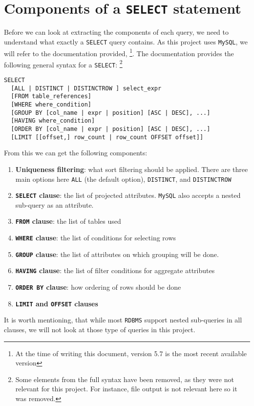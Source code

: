 \section{Components of a \texttt{SELECT} statement}
Before we can look at extracting the components of each query, we need to understand
what exactly a \texttt{SELECT} query contains. As this project uses \texttt{MySQL},
we will refer to the documentation provided, \cite{mysql:documentation}
\footnote{At the time
of writing this document, version 5.7 is the most recent available version}.
The documentation provides the following general syntax for a \texttt{SELECT}:
\footnote{Some elements from the full syntax have been removed, as they
were not relevant for this project. For instance, file output is not relevant here so it
was removed.}

\begin{verbatim}
SELECT
  [ALL | DISTINCT | DISTINCTROW ] select_expr
  [FROM table_references]
  [WHERE where_condition]
  [GROUP BY [col_name | expr | position] [ASC | DESC], ...]
  [HAVING where_condition]
  [ORDER BY [col_name | expr | position] [ASC | DESC], ...]
  [LIMIT [[offset,] row_count | row_count OFFSET offset]]
\end{verbatim}

From this we can get the following components:

\begin{enumerate}
  \item \textbf{Uniqueness filtering}: what sort filtering should be applied. There are
  three main options here \texttt{ALL} (the default option),
  \texttt{DISTINCT}, and \texttt{DISTINCTROW}
  \item \textbf{\texttt{SELECT} clause}: the list of projected attributes. \texttt{MySQL}
  also accepts a nested sub-query as an attribute.
  \item \textbf{\texttt{FROM} clause}: the list of tables used
  \item \textbf{\texttt{WHERE} clause}: the list of conditions for selecting rows
  \item \textbf{\texttt{GROUP} clause}: the list of attributes on which grouping will be
  done.
  \item \textbf{\texttt{HAVING} clause}: the list of filter conditions for aggregate
  attributes
  \item \textbf{\texttt{ORDER BY} clause}: how ordering of rows should be done
  \item \textbf{\texttt{LIMIT} and \texttt{OFFSET} clauses}
\end{enumerate}

It is worth mentioning, that while most \texttt{RDBMS} support nested sub-queries
in all clauses, we will not look at those type of queries in this project.
